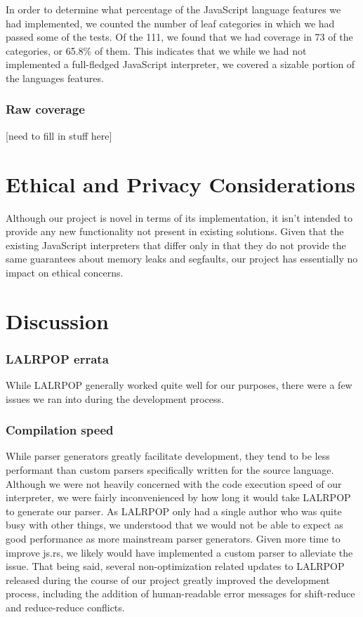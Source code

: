 \documentclass{article}
\begin{document}
In order to determine what percentage of the JavaScript language features we had
implemented, we counted the number of leaf categories in which we had passed
some of the tests. Of the 111, we found that we had coverage in 73 of the
categories, or 65.8\% of them. This indicates that we while we had not
implemented a full-fledged JavaScript interpreter, we covered a sizable portion
of the languages features.

\subsubsection*{Raw coverage}

[need to fill in stuff here]

\section*{Ethical and Privacy Considerations}

Although our project is novel in terms of its implementation, it isn't intended
to provide any new functionality not present in existing solutions. Given that
the existing JavaScript interpreters that differ only in that they do not
provide the same guarantees about memory leaks and segfaults, our project has
essentially no impact on ethical concerns.

\section*{Discussion}

\subsubsection*{LALRPOP errata}

While LALRPOP generally worked quite well for our purposes, there were a few
issues we ran into during the development process.

\subsubsection*{Compilation speed}

While parser generators greatly facilitate development, they tend to be less
performant than custom parsers specifically written for the source language.
Although we were not heavily concerned with the code execution speed of our
interpreter, we were fairly inconvenienced by how long it would take LALRPOP to
generate our parser. As LALRPOP only had a single author who was quite busy with
other things, we understood that we would not be able to expect as good
performance as more mainstream parser generators. Given more time to improve
js.rs, we likely would have implemented a custom parser to alleviate the issue.
That being said, several non-optimization related updates to LALRPOP released
during the course of our project greatly improved the development process,
including the addition of human-readable error messages for shift-reduce and
reduce-reduce conflicts.
\end{document}
